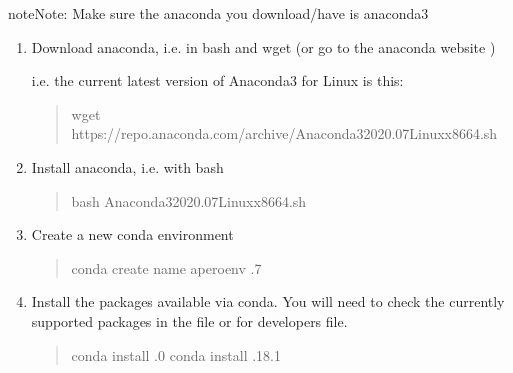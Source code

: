 \documentclass[a4paper,10pt,english]{report}
\begin{document}
\begin{sphinxadmonition}{note}{Note:}
Make sure the anaconda you download/have is anaconda3
\end{sphinxadmonition}
\begin{enumerate}
%
\item {} 
Download anaconda, i.e. in bash and wget (or go to the
anaconda website )

i.e. the current latest version of Anaconda3 for Linux is this:
\begin{quote}

\begin{sphinxVerbatim}[commandchars=\\\{\}]
wget https://repo.anaconda.com/archive/Anaconda3\PYGZhy{}2020.07\PYGZhy{}Linux\PYGZhy{}x86\PYGZus{}64.sh
\end{sphinxVerbatim}
\end{quote}

\item {} 
Install anaconda, i.e. with bash
\begin{quote}

\begin{sphinxVerbatim}[commandchars=\\\{\}]
bash Anaconda3\PYGZhy{}2020.07\PYGZhy{}Linux\PYGZhy{}x86\PYGZus{}64.sh
\end{sphinxVerbatim}
\end{quote}

\item {} 
Create a new conda environment
\begin{quote}

\begin{sphinxVerbatim}[commandchars=\\\{\}]
conda create \PYGZhy{}\PYGZhy{}name apero\PYGZhy{}env .7
\end{sphinxVerbatim}
\end{quote}

\item {} 
Install the packages available via conda. You will need to check the
currently supported packages in the  file
or for developers  file.
\begin{quote}

\begin{sphinxVerbatim}[commandchars=\\\{\}]
conda install .0
conda install .18.1
\end{sphinxVerbatim}


\end{quote}
\end{enumerate}
\end{document}
